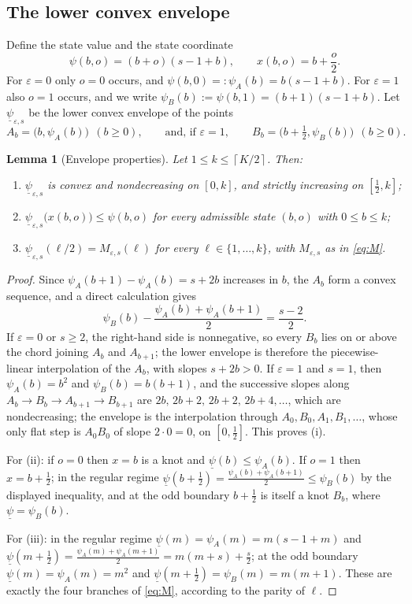 \documentclass[11pt]{article}
\theoremstyle{plain}
\newtheorem{lemma}{Lemma}
\theoremstyle{definition}
\newcommand{\cl}[1]{\left\lceil #1\right\rceil}
\newcommand{\eps}{\varepsilon}
\newcommand{\uw}{\underline{\psi}}
\begin{document}
\subsection{The lower convex envelope}

Define the state value and the state coordinate
\[
\psi(b,o)=(b+o)(s-1+b),\qquad x(b,o)=b+\frac{o}{2}.
\]
For $\eps=0$ only $o=0$ occurs, and $\psi(b,0)=:\psi_A(b)=b(s-1+b)$. For $\eps=1$ also $o=1$ occurs, and we write $\psi_B(b):=\psi(b,1)=(b+1)(s-1+b)$. Let $\uw_{\eps,s}$ be the lower convex envelope of the points
\[
A_b=\bigl(b,\psi_A(b)\bigr)\ \ (b\ge0),\qquad\text{and, if }\eps=1,\qquad B_b=\bigl(b+\tfrac12,\psi_B(b)\bigr)\ \ (b\ge0).
\]

\begin{lemma}[Envelope properties]
\label{lem:envelope}
Let $1\le k\le\cl{K/2}$. Then:
\begin{enumerate}[label=(\roman*)]
\item $\uw_{\eps,s}$ is convex and nondecreasing on $[0,k]$, and strictly increasing on $[\frac12,k]$;
\item $\uw_{\eps,s}\bigl(x(b,o)\bigr)\le\psi(b,o)$ for every admissible state $(b,o)$ with $0\le b\le k$;
\item $\uw_{\eps,s}(\ell/2)=M_{\eps,s}(\ell)$ for every $\ell\in\{1,\dots,k\}$, with $M_{\eps,s}$ as in \eqref{eq:M}.
\end{enumerate}
\end{lemma}

\begin{proof}
Since $\psi_A(b+1)-\psi_A(b)=s+2b$ increases in $b$, the $A_b$ form a convex sequence, and a direct calculation gives
\[
\psi_B(b)-\frac{\psi_A(b)+\psi_A(b+1)}{2}=\frac{s-2}{2}.
\]
If $\eps=0$ or $s\ge2$, the right-hand side is nonnegative, so every $B_b$ lies on or above the chord joining $A_b$ and $A_{b+1}$; the lower envelope is therefore the piecewise-linear interpolation of the $A_b$, with slopes $s+2b>0$. If $\eps=1$ and $s=1$, then $\psi_A(b)=b^2$ and $\psi_B(b)=b(b+1)$, and the successive slopes along $A_b\to B_b\to A_{b+1}\to B_{b+1}$ are $2b,\,2b+2,\,2b+2,\,2b+4,\dots$, which are nondecreasing; the envelope is the interpolation through $A_0,B_0,A_1,B_1,\dots$, whose only flat step is $A_0B_0$ of slope $2\cdot0=0$, on $[0,\tfrac12]$. This proves (i).

For (ii): if $o=0$ then $x=b$ is a knot and $\uw(b)\le\psi_A(b)$. If $o=1$ then $x=b+\frac12$; in the regular regime $\uw(b+\frac12)=\frac{\psi_A(b)+\psi_A(b+1)}{2}\le\psi_B(b)$ by the displayed inequality, and at the odd boundary $b+\frac12$ is itself a knot $B_b$, where $\uw=\psi_B(b)$.

For (iii): in the regular regime $\uw(m)=\psi_A(m)=m(s-1+m)$ and $\uw(m+\frac12)=\frac{\psi_A(m)+\psi_A(m+1)}{2}=m(m+s)+\frac{s}{2}$; at the odd boundary $\uw(m)=\psi_A(m)=m^2$ and $\uw(m+\frac12)=\psi_B(m)=m(m+1)$. These are exactly the four branches of \eqref{eq:M}, according to the parity of $\ell$.
\end{proof}
\end{document}
